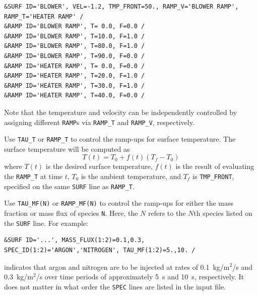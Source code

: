 \documentclass[11pt]{book}
\newcommand{\ct}{\tt\small}
\newcommand{\be}{\begin{equation}}
\newcommand{\ee}{\end{equation}}
\begin{document}
\footnotesize
\begin{verbatim}
&SURF ID='BLOWER', VEL=-1.2, TMP_FRONT=50., RAMP_V='BLOWER RAMP', RAMP_T='HEATER RAMP' /
&RAMP ID='BLOWER RAMP', T= 0.0, F=0.0 /
&RAMP ID='BLOWER RAMP', T=10.0, F=1.0 /
&RAMP ID='BLOWER RAMP', T=80.0, F=1.0 /
&RAMP ID='BLOWER RAMP', T=90.0, F=0.0 /
&RAMP ID='HEATER RAMP', T= 0.0, F=0.0 /
&RAMP ID='HEATER RAMP', T=20.0, F=1.0 /
&RAMP ID='HEATER RAMP', T=30.0, F=1.0 /
&RAMP ID='HEATER RAMP', T=40.0, F=0.0 /
\end{verbatim}
\normalsize

\noindent
Note that the temperature and
velocity can be independently controlled by assigning different
{\ct RAMP}s via {\ct RAMP\_T} and {\ct RAMP\_V}, respectively.

Use {\ct TAU\_T} or {\ct RAMP\_T}
to control the ramp-ups for surface temperature.
The surface temperature will be computed as
\be
   T(t) = T_0 + f(t) \left( T_f - T_0 \right)
\ee
where $T(t)$ is the desired surface temperature, $f(t)$ is the result of evaluating the
{\ct RAMP\_T} at time $t$, $T_0$ is the ambient temperature, and $T_f$ is {\ct TMP\_FRONT}, specified on the same {\ct SURF} line as {\ct RAMP\_T}.

Use {\ct TAU\_MF(N)} or {\ct RAMP\_MF(N)}
to control the ramp-ups for either the mass
fraction or mass flux of species {\ct N}. Here, the $N$ refers to the $N$th species listed on the {\ct SURF} line. For example:

\footnotesize
\begin{verbatim}
&SURF ID='...', MASS_FLUX(1:2)=0.1,0.3, SPEC_ID(1:2)='ARGON','NITROGEN', TAU_MF(1:2)=5.,10. /
\end{verbatim}
\normalsize

\noindent
indicates that argon and nitrogen are to be injected at rates of 0.1~kg/m$^2$/s and 0.3~kg/m$^2$/s over time periods of approximately 5~s and 10~s, respectively. It does not
matter in what order the {\ct SPEC} lines are listed in the input file.
\end{document}
